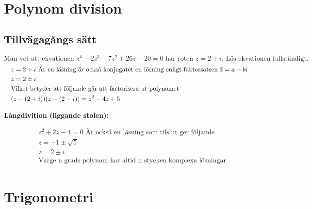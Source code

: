 \begin{multicols}{2}
\newpage

\section{Polynom division}
\subsection{Tillvägagångs sätt}
\begin{equation}
   \text{Man vet att ekvationen } z^4 - 2z^3 - 7z^2 + 26z - 20 = 0 \text{ har roten } z = 2 + i \text{. Lös ekvationen fullständigt.}
\end{equation}
\begin{align*}
  &\quad z = 2 + i \text{ Är en läsning är också konjugatet en lösning enligt faktorsatsen } \overline{\rm z}= a - b i \\
  &\quad z = 2 \pm i \\
  &\quad \text{Vilket betyder att följande går att factorisera ut polynomet} \\
  &\quad (z -(2 + i))(z -(2 - i)) = z^2 - 4z + 5 \\
\end{align*}

\textbf{Långdivition (liggande stolen):}\par
{}%

\begin{align*}
  &\quad z^2 + 2z - 4 = 0 \text{ Är också en läsning som tilslut ger följande} \\
  &\quad z = -1 \pm \sqrt{5} \\
  &\quad z = 2 \pm i \\
  &\quad \text{Varge n grads polynom har altid n stycken komplexa lösningar} \\
\end{align*}


\newpage

\section{Trigonometri}
\end{multicols}
